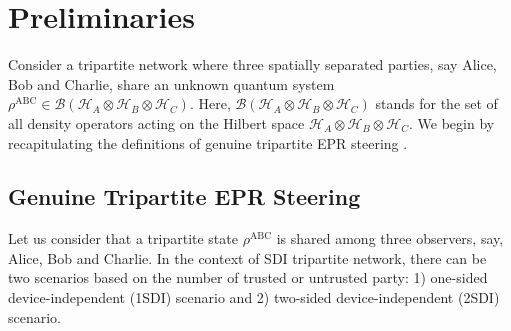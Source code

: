 \documentclass[reprint,superscriptaddress,nofootinbib,amsmath,amssymb,aps,pra,longbibliography]{revtex4-1}
\begin{document}
\section{Preliminaries}\label{section2}

Consider a tripartite network where three spatially separated parties, say Alice, Bob and Charlie, share an unknown quantum system $\rho^{\text{ABC}} \in \mathcal{B}(\mathcal{H}_A \otimes \mathcal{H}_B \otimes \mathcal{H}_C)$.
Here, $\mathcal{B}(\mathcal{H}_A \otimes \mathcal{H}_B \otimes \mathcal{H}_C)$ stands for the set of all density operators acting on the Hilbert space $\mathcal{H}_A \otimes \mathcal{H}_B \otimes \mathcal{H}_C$. We begin by recapitulating the definitions of genuine tripartite EPR steering \cite{Cavalcanti15,Cavalcanti16,Bihalan18}.

\subsection{Genuine Tripartite EPR Steering}

Let us consider that a tripartite state $\rho^{\text{ABC}}$ is shared among three observers, say, Alice, Bob and Charlie. In the context of SDI tripartite network, there can be two scenarios based on the number of trusted or untrusted party: 1) one-sided device-independent (1SDI) scenario and 2) two-sided device-independent (2SDI) scenario.


\end{document}

